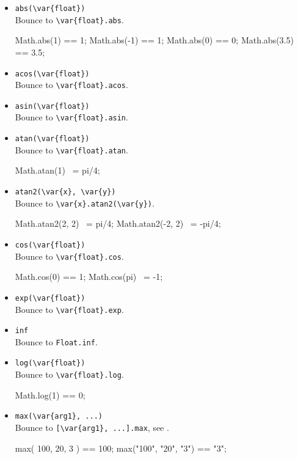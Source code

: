 \begin{itemize}
\item \lstinline|abs(\var{float})|\\
  Bounce to \lstinline|\var{float}.abs|.
\begin{urbiassert}
Math.abs(1) == 1;
Math.abs(-1) == 1;
Math.abs(0) == 0;
Math.abs(3.5) == 3.5;
\end{urbiassert}
\item \lstinline|acos(\var{float})|\\
  Bounce to \lstinline|\var{float}.acos|.

\item \lstinline|asin(\var{float})|\\
  Bounce to \lstinline|\var{float}.asin|.

\item \lstinline|atan(\var{float})|\\
  Bounce to \lstinline|\var{float}.atan|.
\begin{urbiassert}
Math.atan(1) ~= pi/4;
\end{urbiassert}

\item \lstinline|atan2(\var{x}, \var{y})|\\
  Bounce to \lstinline|\var{x}.atan2(\var{y})|.
\begin{urbiassert}
Math.atan2(2, 2) ~= pi/4;
Math.atan2(-2, 2) ~= -pi/4;
\end{urbiassert}

\item \lstinline|cos(\var{float})|\\
  Bounce to \lstinline|\var{float}.cos|.
\begin{urbiassert}
Math.cos(0) == 1;
Math.cos(pi) ~= -1;
\end{urbiassert}

\item \lstinline|exp(\var{float})|\\
  Bounce to \lstinline|\var{float}.exp|.

\item \lstinline|inf|\\
  Bounce to \lstinline|Float.inf|.

\item \lstinline|log(\var{float})|\\
  Bounce to \lstinline|\var{float}.log|.
\begin{urbiassert}
Math.log(1) == 0;
\end{urbiassert}

\item \lstinline|max(\var{arg1}, ...)|\\
  Bounce to \lstinline|[\var{arg1}, ...].max|, see .
\begin{urbiassert}
max( 100,   20,   3 ) == 100;
max("100", "20", "3") == "3";
\end{urbiassert}


\end{itemize}
